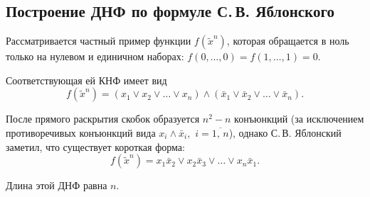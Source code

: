 \documentclass[12pt,a4paper,oneside,fleqn,leqno]{article}
\theoremstyle{definition}
\begin{document}
		\subsection{Построение ДНФ по формуле С.\,В. Яблонского}\label{jab}
			Рассматривается частный пример функции $f(\tilde x^n)$, которая обращается в ноль только на нулевом и единичном наборах: $f(0,\ldots,0) = f(1,\ldots,1) = 0.$\par
			Соответствующая ей КНФ имеет вид
			$$
				f(\tilde x^n) = (x_1 \vee x_2 \vee \ldots \vee x_n)\wedge(\bar{x}_1 \vee \bar{x}_2 \vee \ldots \vee \bar{x}_n).
			$$\par
			После прямого раскрытия скобок образуется $n^2 - n$ конъюнкций (за исключением противоречивых конъюнкций вида $x_i\wedge\bar{x}_i,\,\,i = \overline{1,\,n}$), однако С.\,В. Яблонский заметил, что существует короткая форма:
			$$
				f(\tilde x^n) = x_1\bar{x}_2 \vee x_2\bar{x}_3 \vee \ldots \vee x_n \bar{x}_1.
			$$\par
			Длина этой ДНФ равна $n.$
\end{document}
